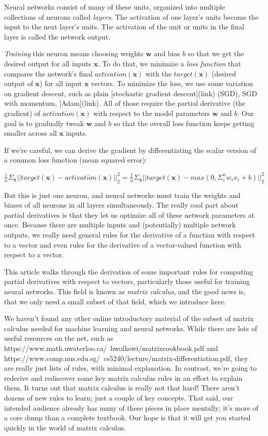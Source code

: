 \documentclass[11pt]{article}
\begin{document}
Neural networks consist of many of these units, organized into multiple collections of neurons called {\em layers}. The activation of one layer's units become the input to the next layer's units. The activation of the unit or units in the final layer is called the network output.

{\em Training} this neuron means choosing weights $\mathbf{w}$ and bias $b$ so that we get the desired output for all inputs $\mathbf{x}$.  To do that, we minimize a {\em loss function} that compares the network's final $activation({\mathbf{x}})$ with the $target(\mathbf{x})$ (desired output of $\mathbf{x}$) for all input $\mathbf{x}$ vectors. To minimize the loss, we use some variation on gradient descent, such as plain [stochastic gradient descent](link) (SGD), SGD with momentum, [Adam](link).   All of those require the partial derivative (the gradient) of $activation({\mathbf{x}})$ with respect to the model parameters $\mathbf{w}$ and $b$. Our goal is to gradually tweak $\mathbf{w}$ and $b$ so that the overall loss function keeps getting smaller across all $\mathbf{x}$ inputs.

If we're careful, we can derive the gradient by differentiating the scalar version of a common loss function (mean squared error):

$\frac{1}{n} \Sigma_{\mathbf{x}} ||target(\mathbf{x}) - activation(\mathbf{x})||_2^2 = \frac{1}{n} \Sigma_{\mathbf{x}} ||target(\mathbf{x}) - max(0, \Sigma_i^n w_i x_i + b)||_2^2$

But this is just one neuron, and neural networks must train the weights and biases of all neurons in all layers simultaneously.  The really cool part about partial derivatives is that they let us optimize all of these network parameters at once.  Because there are multiple inputs and (potentially) multiple network outputs, we really need general rules for the derivative of a function with respect to a vector and even rules for the derivative of a vector-valued function with respect to a vector.

This article walks through the derivation of some important rules for computing partial derivatives with respect to vectors, particularly those useful for training neural networks. This field is known as {\em matrix calculus}, and the good news is, that we only need a small subset of that field, which we introduce here. 

We haven't found any other online introductory material of the subset of matrix calculus needed for machine learning and neural networks. While there are lots of useful resources on the net, such as https://www.math.uwaterloo.ca/~hwolkowi/matrixcookbook.pdf and  https://www.comp.nus.edu.sg/~cs5240/lecture/matrix-differentiation.pdf, they are really just lists of rules, with minimal explanation. In contrast, we're going to rederive and rediscover some key matrix calculus rules in an effort to explain them. It turns out that matrix calculus is really not that hard! There aren't dozens of new rules to learn; just a couple of key concepts.  That said, our intended audience already has many of these pieces in place mentally; it's more of a core dump than a complete textbook. Our hope is that it will get you started quickly in the world of matrix calculus.
\end{document}
